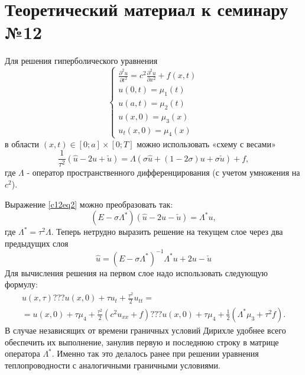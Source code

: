 \section{Теоретический материал к семинару №12}
Для решения гиперболического уравнения
\begin{equation} \label{c12eq1}
	\begin{cases}
		\displaystyle \frac{\partial^2 u}{\partial t^2} = c^2 \frac{\partial^2 u}{\partial x^2} + f(x,t) \\
		u(0,t) = \mu_1(t) \\
		u(a,t) = \mu_2(t) \\
		u(x,0) = \mu_3(x) \\
		u_t(x,0) = \mu_4(x)
	\end{cases}
\end{equation}
в области $(x,t) \in [0; a] \times [0; T]$ можно использовать «схему с весами» 
\begin{equation} \label{c12eq2}
	\frac{1}{\tau^2} \left( \hat{u} - 2u + \check{u} \right) = \Lambda \left( \sigma \hat{u} + \left( 1 - 2 \sigma \right) u + \sigma \check{u} \right) + f,
\end{equation}
где $\Lambda$ - оператор пространственного дифференцирования (с учетом умножения на $c^2$).

Выражение \eqref{c12eq2} можно преобразовать так:
\begin{equation} \label{c12eq3}
	\left( E - \sigma \Lambda^* \right) \left( \hat{u} - 2u - \check{u} \right) = \Lambda^* u,
\end{equation}
где $\Lambda^* = \tau^2 \Lambda$. Теперь нетрудно выразить решение на текущем слое через два предыдущих слоя
\begin{equation} \label{c12eq4}
	\hat{u} = \left( E - \sigma \Lambda^* \right)^{-1} \Lambda^* u + 2u - \check{u}
\end{equation}
Для вычисления решения на первом слое надо использовать следующую формулу:
\begin{equation} \label{c12eq5}
	\begin{split}
		u(x,\tau) ??? u(x,0) + \tau u_t + \frac{\tau^2}{2} u_{tt} = \\
		= u(x,0) + \tau \mu_4 + \frac{\tau^2}{2} \left(c^2 u_{xx} + f \right) ??? u(x,0) + \tau \mu_4 + \frac{1}{2} \left( \Lambda^* \mu_3 + \tau^2 f \right).
	\end{split}
\end{equation}
В случае независящих от времени граничных условий Дирихле удобнее всего обеспечить их выполнение, занулив первую и последнюю строку в матрице оператора $\Lambda^*$. Именно так это делалось ранее при решении уравнения теплопроводности с аналогичными граничными условиями.

